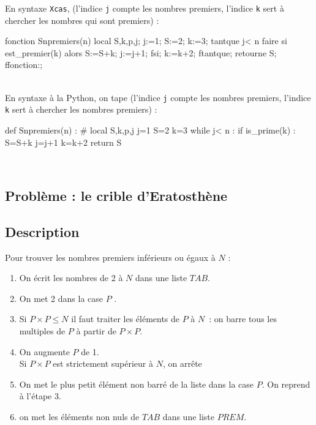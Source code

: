 \documentclass[12pt,a4paper]{book}
\begin{document}
\begin{giacjshere}
En syntaxe {\tt Xcas}, (l'indice {\tt j} compte les nombres premiers,
l'indice {\tt k} sert \`a chercher les nombres qui sont premiers) :
\begin{giacprog}
fonction Snpremiers(n)
  local S,k,p,j;
  j:=1;
  S:=2;
  k:=3;
  tantque j< n faire
     si est_premier(k) alors 
       S:=S+k;
       j:=j+1;
     fsi;
     k:=k+2;
  ftantque;
  retourne S;
ffonction:;  
\end{giacprog}

\\
En syntaxe \`a la Python, on tape (l'indice {\tt j} compte les nombres premiers,
l'indice {\tt k} sert \`a chercher les nombres premiers) :
\begin{giacprog}
def Snpremiers(n) :
    # local S,k,p,j
    j=1
    S=2
    k=3
    while j< n :
        if is_prime(k) : 
            S=S+k
            j=j+1
        k=k+2
    return S 
\end{giacprog}
\\

\subsection{Probl\`eme : le crible d'Eratosth\`ene}
\subsection{Description}
Pour trouver les nombres premiers inf\'erieurs ou \'egaux \`a $N$ :
\begin{enumerate}
\item On \'ecrit les nombres de 2 \`a $N$ dans une liste $TAB$.
\item On met 2 dans la case $P$ .
\item Si $P \times P \leq N$ il faut traiter les \'el\'ements de $P$ \`a $N$~:
on barre tous les multiples de $P$ \`a partir de $P \times P$.
\item On augmente $P$ de 1.\\
Si $P\times P$ est strictement sup\'erieur \`a $N$, on arr\^ete
\item On met le plus petit \'el\'ement non barr\'e de la liste dans la case
 $P$. On reprend \`a l'\'etape 3.
\item on met les \'el\'ements non nuls de $TAB$ dans une liste $PREM$.
\end{enumerate}

\end{giacjshere}
\end{document}
